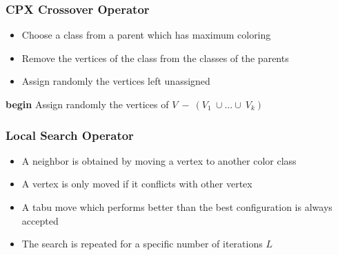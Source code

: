 \documentclass{beamer}
\begin{document}
\begin{frame}
\frametitle{CPX Crossover Operator}
\begin{multicols}{2}
\begin{itemize}
\item Choose a class from a parent which has maximum coloring
\item Remove the vertices of the class from the classes of the parents
\item Assign randomly the vertices left unassigned
\end{itemize}
\columnbreak
\tiny{
\begin{algorithm}[H]
{\bf begin}\;
Assign randomly the vertices of $V\ -\ (V_1\ \cup ... \cup\ V_k)$\;
\end{algorithm}
}
\end{multicols}

\end{frame}

\begin{frame}

\frametitle{Local Search Operator}

\begin{itemize}

\item A neighbor is obtained by moving a vertex to another color class
\item A vertex is only moved if it conflicts with other vertex
\item A tabu move which performs better than the best configuration is always accepted
\item The search is repeated for a specific number of iterations $L$

\end{itemize}

\end{frame}
\end{document}
